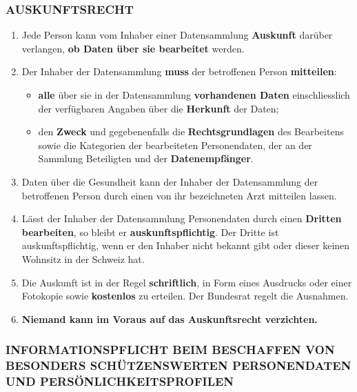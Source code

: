 \hypertarget{auskunftsrecht}{%
\subsubsection{AUSKUNFTSRECHT}\label{auskunftsrecht}}

\begin{enumerate}
\def\labelenumi{\arabic{enumi}.}
\item
  Jede Person kann vom Inhaber einer Datensammlung \textbf{Auskunft}
  darüber verlangen, \textbf{ob Daten über sie bearbeitet} werden.
\item
  Der Inhaber der Datensammlung \textbf{muss} der betroffenen Person
  \textbf{mitteilen}:

  \begin{itemize}
  \tightlist
  \item
    \textbf{alle} über sie in der Datensammlung \textbf{vorhandenen
    Daten} einschliesslich der verfügbaren Angaben über die
    \textbf{Herkunft} der Daten;
  \item
    den \textbf{Zweck} und gegebenenfalls die \textbf{Rechtsgrundlagen}
    des Bearbeitens sowie die Kategorien der bearbeiteten Personendaten,
    der an der Sammlung Beteiligten und der \textbf{Datenempfänger}.
  \end{itemize}
\item
  Daten über die Gesundheit kann der Inhaber der Datensammlung der
  betroffenen Person durch einen von ihr bezeichneten Arzt mitteilen
  lassen.
\item
  Lässt der Inhaber der Datensammlung Personendaten durch einen
  \textbf{Dritten bearbeiten}, so bleibt er \textbf{auskunftspflichtig}.
  Der Dritte ist auskunftspflichtig, wenn er den Inhaber nicht bekannt
  gibt oder dieser keinen Wohnsitz in der Schweiz hat.
\item
  Die Auskunft ist in der Regel \textbf{schriftlich}, in Form eines
  Ausdrucks oder einer Fotokopie sowie \textbf{kostenlos} zu erteilen.
  Der Bundesrat regelt die Ausnahmen.
\item
  \textbf{Niemand kann im Voraus auf das Auskunftsrecht verzichten.}
\end{enumerate}

\hypertarget{informationspflicht-beim-beschaffen-von-besonders-schuxfctzenswerten-personendaten-und-persuxf6nlichkeitsprofilen}{%
\subsubsection{INFORMATIONSPFLICHT BEIM BESCHAFFEN VON BESONDERS
SCHÜTZENSWERTEN PERSONENDATEN UND
PERSÖNLICHKEITSPROFILEN}\label{informationspflicht-beim-beschaffen-von-besonders-schuxfctzenswerten-personendaten-und-persuxf6nlichkeitsprofilen}}

